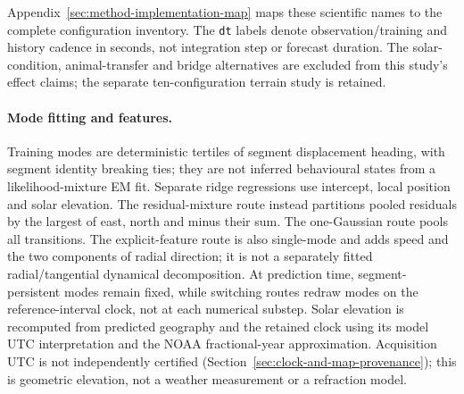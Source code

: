 \documentclass[11pt]{article}
\begin{document}
\noindent Appendix~\ref{sec:method-implementation-map} maps these scientific
names to the complete configuration inventory. The \texttt{dt} labels denote
observation/training and history cadence in seconds, not integration step
or forecast duration. The solar-condition, animal-transfer and bridge
alternatives are excluded from this study's effect claims; the separate
ten-configuration terrain study is retained.

\paragraph{Mode fitting and features.}
Training modes are deterministic tertiles of segment displacement heading,
with segment identity breaking ties; they are not inferred behavioural states
from a likelihood-mixture EM fit. Separate ridge regressions use intercept,
local position and solar elevation. The residual-mixture route instead
partitions pooled residuals by the largest of east, north and minus their sum.
The one-Gaussian route pools all transitions. The explicit-feature route is
also single-mode and adds speed and the two components of radial direction;
it is not a separately fitted radial/tangential dynamical decomposition.
At prediction time, segment-persistent modes remain fixed, while switching
routes redraw modes on the reference-interval clock, not at each numerical
substep. Solar elevation is recomputed from predicted geography and the
retained clock using its model UTC interpretation and the NOAA fractional-year
approximation\cite{noaa}. Acquisition UTC is not independently certified
(Section~\ref{sec:clock-and-map-provenance}); this is geometric elevation,
not a weather measurement or a refraction model.

\end{document}
